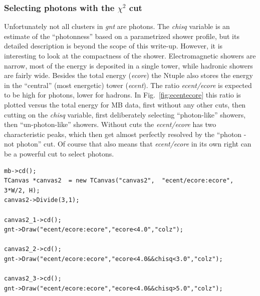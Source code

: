 \documentclass[pdftex,12pt,letter]{article}
\begin{document}
\subsubsection{Selecting photons with the $\chi^2$ cut }
Unfortunately not all clusters in {\it gnt} are photons.  The 
{\it chisq} variable is an estimate of the ``photonness'' based on a
parametrized shower profile, but its detailed description is beyond
the scope of this write-up.  However, it is interesting to look at the
compactness of the shower.  Electromagnetic showers are narrow, most
of the energy is deposited in a single tower, while
hadronic showers are fairly wide.  Besides the total energy 
({\it ecore}) the Ntuple also stores the energy in the ``central''
(most energetic) tower ({\it ecent}).  The ratio
{\it ecent/ecore} is expected to be high for photons, lower for
hadrons.  In Fig.~\ref{fig:ecentecore} this ratio is plotted versus
the total energy for MB data, first without any other cuts, then
cutting on the {\it chisq} variable, first deliberately selecting 
``photon-like'' showers, then ``un-photon-like'' showers.  Without
cuts the {\it ecent/ecore} has two characteristic peaks, which then
get almost perfectly resolved by the ``photon - not photon'' cut.  Of
course that also means that {\it ecent/ecore} in its own right can be
a powerful cut to select photons. 

\begin{lstlisting}
mb->cd();
TCanvas *canvas2  = new TCanvas("canvas2",  "ecent/ecore:ecore", 3*W/2, H);
canvas2->Divide(3,1);

canvas2_1->cd();
gnt->Draw("ecent/ecore:ecore","ecore<4.0","colz");

canvas2_2->cd();
gnt->Draw("ecent/ecore:ecore","ecore<4.0&&chisq<3.0","colz");

canvas2_3->cd();
gnt->Draw("ecent/ecore:ecore","ecore<4.0&&chisq>5.0","colz");
\end{lstlisting}
\end{document}
